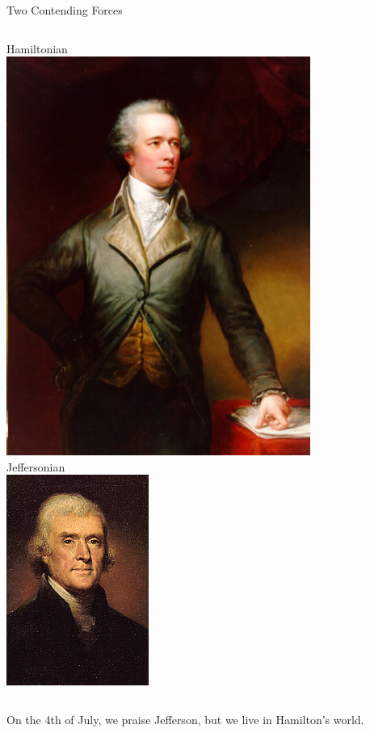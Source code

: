\begin{frame}{Two Contending Forces}
    \begin{columns}[c]
            \centering
            \large{Hamiltonian} \\
            \vspace{15pt}
            \includegraphics[height=0.60\textheight]{img/hamilton-portrait.png} \\
        \column{0.5\textheight}
            \centering
            \large{Jeffersonian} \\
            \vspace{15pt}
            \includegraphics[height=0.60\textheight]{img/jefferson.png} \\
    \end{columns}
    \pause
    \vspace{20pt}
    On the 4th of July, we praise Jefferson, but we live in Hamilton's world.
\end{frame}

